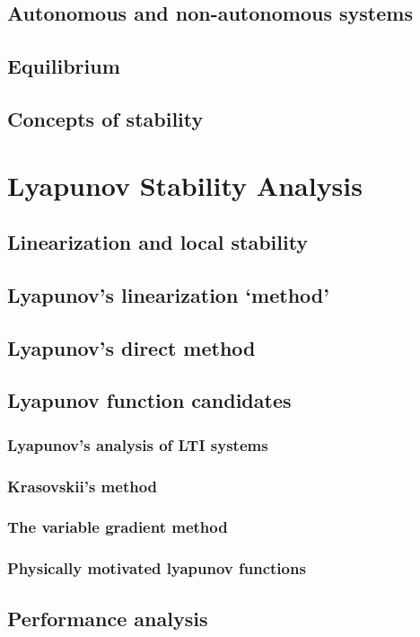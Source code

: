 \documentclass{article}
\begin{document}
\subsection{Autonomous and non-autonomous systems}
\subsection{Equilibrium}
\subsection{Concepts of stability}

\section{Lyapunov Stability Analysis}
\subsection{Linearization and local stability}
\subsection{Lyapunov's linearization `method'}
\subsection{Lyapunov's direct method}
\subsection{Lyapunov function candidates}
\subsubsection{Lyapunov's analysis of LTI systems}
\subsubsection{Krasovskii's method}
\subsubsection{The variable gradient method}
\subsubsection{Physically motivated lyapunov functions}
\subsection{Performance analysis}
\end{document}
